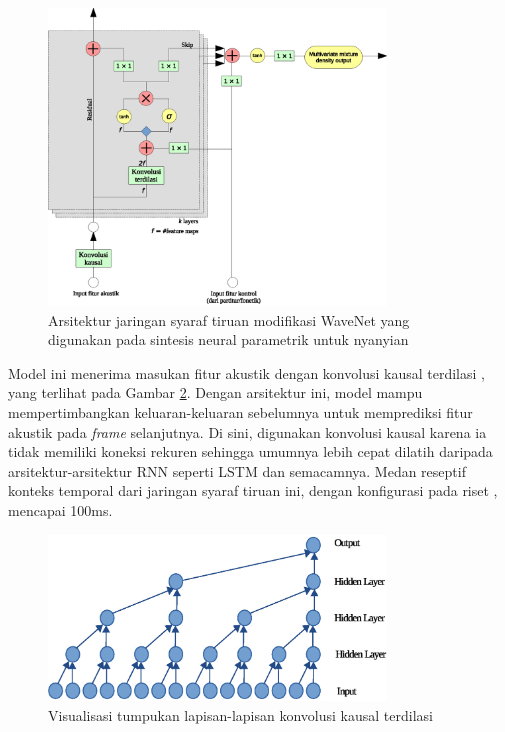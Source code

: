 \begin{figure}[h]
    \centering
    \includegraphics[width=0.8\textwidth]{resources/network-architecture-bonada.eps}
    \caption{Arsitektur jaringan syaraf tiruan modifikasi WaveNet yang digunakan pada sintesis neural parametrik untuk nyanyian\parencite{bonada2017singing}}\label{fig-network-architecture-bonada}
\end{figure}

Model ini menerima masukan fitur akustik dengan konvolusi kausal terdilasi \parencite{Oord2016WaveNetAG}, yang terlihat pada Gambar \ref{fig-dilated-cnn}. Dengan arsitektur ini, model mampu mempertimbangkan keluaran-keluaran sebelumnya untuk memprediksi fitur akustik pada \textit{frame} selanjutnya. Di sini, digunakan konvolusi kausal karena ia tidak memiliki koneksi rekuren sehingga umumnya lebih cepat dilatih daripada arsitektur-arsitektur RNN seperti LSTM dan semacamnya.\parencite{Oord2016WaveNetAG} Medan reseptif konteks temporal dari jaringan syaraf tiruan ini, dengan konfigurasi pada riset \citet{bonada2017singing}, mencapai 100ms.

\begin{figure}[h]
    \centering
    \includegraphics[width=0.8\textwidth]{resources/dilated-cnn.eps}
    \caption{Visualisasi tumpukan lapisan-lapisan konvolusi kausal terdilasi \parencite{Oord2016WaveNetAG}}\label{fig-dilated-cnn}
\end{figure}

